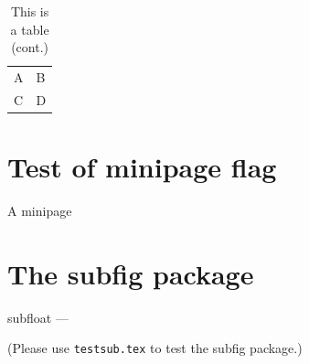 \documentclass[a4paper]{article}
\def\ifundefined#1{\expandafter\ifx\csname#1\endcsname\relax}
\let\oldsection\section
\def\section#1{\typeout{#1}\oldsection{#1}}
\begin{document}
\begin{table}[!ht]
\ContinuedFloat
\caption{This is a table (cont.)}
\centering\begin{tabular}{ll}
A & B \\
C & D \\
\end{tabular}
\end{table}

\begingroup
  \let\section\oldsection
  \listoftables
\endgroup

\captionsetup{style=default,position=default,aboveskip=10pt,belowskip=0pt}



\clearpage
\section{Test of minipage flag}

\begin{minipage}\linewidth
\makeatletter
\if@minipage
{}
\else
{}
\fi
\makeatother
{}
\makeatletter
\if@minipage
{}
\else
{}
\fi
\makeatother

A minipage
\end{minipage}



\captionsetup{font=sl,labelfont=bf,labelsep=period}
\DeleteShortVerb{\|}



\clearpage
\section{The subfig package}

\ifundefined{subfloat}
---\par
(Please use \verb|testsub.tex| to test the subfig package.)
\else
\end{document}
